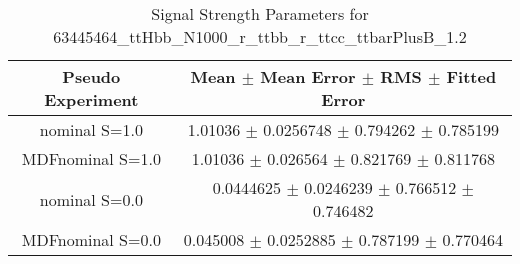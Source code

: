 \begin{table}
\centering
\caption{Signal Strength Parameters for 63445464\_ttHbb\_N1000\_r\_ttbb\_r\_ttcc\_ttbarPlusB\_1.2}
\begin{tabular}{cc}
\toprule
Pseudo Experiment & Mean $\pm$ Mean Error $\pm$ RMS $\pm$ Fitted Error\\
\midrule
nominal S=1.0 & \num{1.01036} $\pm$ \num{0.0256748} $\pm$ \num{0.794262} $\pm$ \num{0.785199}\\
MDFnominal S=1.0 & \num{1.01036} $\pm$ \num{0.026564} $\pm$ \num{0.821769} $\pm$ \num{0.811768}\\
nominal S=0.0 & \num{0.0444625} $\pm$ \num{0.0246239} $\pm$ \num{0.766512} $\pm$ \num{0.746482}\\
MDFnominal S=0.0 & \num{0.045008} $\pm$ \num{0.0252885} $\pm$ \num{0.787199} $\pm$ \num{0.770464}\\
\bottomrule
\end{tabular}
\end{table}